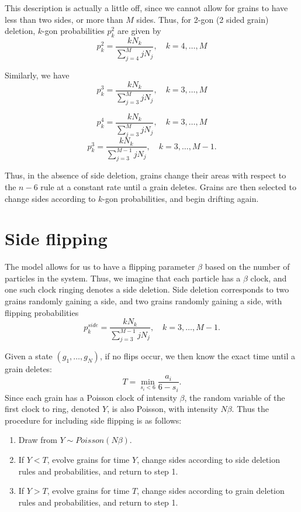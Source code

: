 \documentclass{amsart}
\begin{document}
This description is actually a little off, since we cannot allow for grains to have less than two sides, or more than $M$ sides.  Thus, for 2-gon (2 sided grain) deletion, $k$-gon probabilities $p_k^2$ are given by
\begin{equation}
p_k^2 = \frac{kN_k}{\sum_{j=4}^M jN_j},\quad k = 4,\dots, M 
\end{equation}

Similarly, we have
\begin{equation}
p_k^3 = \frac{kN_k}{\sum_{j=3}^M jN_j}, \quad k = 3,\dots, M 
\end{equation}

\begin{equation}
p_k^4 = \frac{kN_k}{\sum_{j=3}^M jN_j}, \quad k = 3,\dots, M 
\end{equation}
\begin{equation}
p_k^3 = \frac{kN_k}{\sum_{j=3}^{M-1} jN_j}, \quad k = 3,\dots, M-1 .
\end{equation}

Thus, in the absence of side deletion, grains change their areas with respect to the $n-6$ rule at a constant rate until a grain deletes.  Grains are then selected to change sides according to $k$-gon probabilities, and begin drifting again.

\section{Side flipping}
The model allows for us to have a flipping parameter $\beta$ based on the number of particles in the system.  Thus, we imagine that each particle has a $\beta$ clock, and one such clock ringing denotes a side deletion. Side deletion corresponds to two grains randomly gaining a side, and two grains randomly gaining a side, with flipping probabilities
\begin{equation}
p_k^{side} = \frac{kN_k}{\sum_{j=3}^{M-1} jN_j}, \quad k = 3,\dots, M-1 .
\end{equation}


 Given a state $(g_1,\dots,g_N)$, if no flips occur, we then know the exact time until a grain deletes:
\begin{equation}
T = \min_{s_i<6} \frac {a_i}{6-s_i}. 
\end{equation}
Since each grain has a Poisson clock of intensity $\beta$, the random variable of the first clock to ring, denoted $Y$,  is also Poisson, with intensity $N\beta$.  Thus the procedure for including side flipping is as follows:\begin{enumerate}
\item Draw from $Y \sim Poisson(N\beta)$.
\item If $Y<T$, evolve grains for time $Y$, change sides according to side deletion rules and probabilities, and return to step 1.
\item If $Y>T$, evolve grains for time $T$, change sides according to grain deletion rules and probabilities, and return to step 1.
\end{enumerate}
\end{document}
